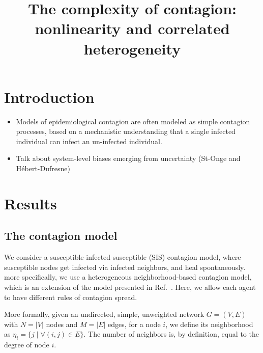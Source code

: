 \documentclass[10pt,aps,pre,twocolumn,nopacs,final,letterpaper,superscriptaddress,longbibliography]{revtex4-2}
\begin{document}
\title{The complexity of contagion: nonlinearity and correlated heterogeneity}

\begin{abstract}

\end{abstract}

\maketitle

\section{Introduction} %

\begin{itemize}
    \item Models of epidemiological contagion are often modeled as simple contagion processes, based on a mechanistic understanding that a single infected individual can infect an un-infected individual.
    \item Talk about system-level biases emerging from uncertainty (St-Onge and H\'ebert-Dufresne)
\end{itemize}

\section{Results}

\subsection{The contagion model}

We consider a susceptible-infected-susceptible (SIS) contagion model, where susceptible nodes get infected via infected neighbors, and heal spontaneously. more specifically, we use a heterogeneous neighborhood-based contagion model, which is an extension of the model presented in Ref.~\cite{landry_reconstructing_2024}. Here, we allow each agent to have different rules of contagion spread.

More formally, given an undirected, simple, unweighted network $G = (V, E)$ with $N = |V|$ nodes and $M=|E|$ edges, for a node $i$, we define its neighborhood as $\eta_i = \{j \mid \forall (i, j)\in E\}$. The number of neighbors is, by definition, equal to the degree of node $i$.
\end{document}
